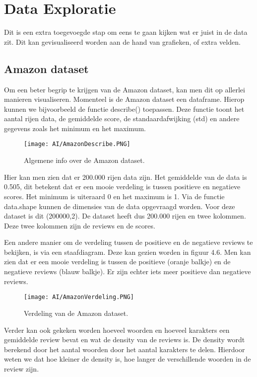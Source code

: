 \section{Data Exploratie}
\label{proofofconceptdataexploratie}
Dit is een extra toegevoegde stap om eens te gaan kijken wat er juist in de data zit. Dit kan gevisualiseerd worden aan de hand van grafieken, of extra velden. 

\subsection{Amazon dataset}
Om een beter begrip te krijgen van de Amazon dataset, kan men dit op allerlei manieren visualiseren. Momenteel is de Amazon dataset een dataframe. Hierop kunnen we bijvoorbeeld de functie describe() toepassen. Deze functie toont het aantal rijen data, de gemiddelde score, de standaardafwijking (std) en andere gegevens zoals het minimum en het maximum. 

\begin{figure}[!htbp]
    \texttt{[image: AI/AmazonDescribe.PNG]}
    \caption{\label{amazondescribe}Algemene info over de Amazon dataset.}
\end{figure}
\FloatBarrier 

Hier kan men zien dat er 200.000 rijen data zijn. Het gemiddelde van de data is 0.505, dit betekent dat er een mooie verdeling is tussen positieve en negatieve scores. Het minimum is uiteraard 0 en het maximum is 1. Via de functie data.shape kunnen de dimensies van de data opgevraagd worden. Voor deze dataset is dit (200000,2). De dataset heeft dus 200.000 rijen en twee kolommen. Deze twee kolommen zijn de reviews en de scores. 

Een andere manier om de verdeling tussen de positieve en de negatieve reviews te bekijken, is via een staafdiagram. Deze kan gezien worden in figuur 4.6. Men kan zien dat er een mooie verdeling is tussen de positieve (oranje balkje) en de negatieve reviews (blauw balkje). Er zijn echter iets meer positieve dan negatieve reviews.

\begin{figure}[!htbp]
    \texttt{[image: AI/AmazonVerdeling.PNG]}
    \caption{\label{amazonverdeling}Verdeling van de Amazon dataset.}
\end{figure}
\FloatBarrier 

Verder kan ook gekeken worden hoeveel woorden en hoeveel karakters een gemiddelde review bevat en wat de density van de reviews is. De density wordt berekend door het aantal woorden door het aantal karakters te delen. Hierdoor weten we dat hoe kleiner de density is, hoe langer de verschillende woorden in de review zijn. 

